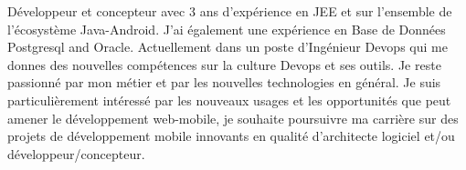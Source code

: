 %
%
%
\par{
Développeur et concepteur avec 3 ans d'expérience en JEE et sur l'ensemble de l'écosystème Java-Android. J'ai également une expérience en Base de Données Postgresql and Oracle. Actuellement dans un poste d'Ingénieur Devops qui me donnes des nouvelles compétences sur la culture Devops et ses outils. Je reste passionné par mon métier et par les nouvelles technologies en général. Je suis particulièrement intéressé par les nouveaux usages et les opportunités que peut amener le développement web-mobile, je souhaite poursuivre ma carrière sur des projets de développement mobile innovants en qualité d'architecte logiciel et/ou développeur/concepteur.
}
